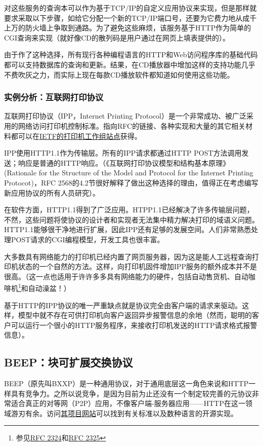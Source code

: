 \documentclass[12pt,oneside]{book}
\begin{document}
对这些服务的查询本可以作为基于TCP/IP的自定义应用协议来实现，但是那样就要求采取以下步骤，如给它分配一个新的TCP/IP端口号，还要为它费力地从成千上万的防火墙上争取到通路。为了避免这些麻烦，该服务基于HTTP作为简单的CGI查询来实现（就好像CD的散列码是用户通过在网页上填表提供的）。

由于作了这种选择，所有现行各种编程语言的HTTP和Web访问程序库的基础代码都可以支持数据库的查询和更新。结果，在CD播放器中增加这样的支持功能几乎不费吹灰之力，而实际上现在每款CD播放软件都知道如何使用这些功能。

\subsubsection{实例分析：互联网打印协议}
互联网打印协议（IPP，Internet Printing Protocol）是一个非常成功、被广泛采用的网络访问打印机控制标准。指向RFC的链接、各种实现和大量的其它相关材料都可以在\href{http://www.pwg.org/ipp/}{IETF的打印机工作组站点}获得。

IPP使用HTTP1.1作为传输层。所有的IPP请求都通过HTTP POST方法调用发送；响应是普通的HTTP响应。（《互联网打印协议模型和结构基本原理》(Rationale for the Structure of the Model and Protocol for the Internet Printing Protocot)，RFC 2568的4.2节很好解释了做出这种选择的理由，值得正在考虑编写新应用协议的所有人员研究）。

在软件方面，HTTP1.1得到了广泛应用。HTPP1.1已经解决了许多传输层问题，不然，这些问题将使协议的设计者和实现者无法集中精力解决打印的域语义问题。HTTP1.1能够很干净地进行扩展，因此IPP还有足够的发展空间。人们非常熟悉处理POST请求的CGI编程模型，开发工具也很丰富。

大多数具有网络能力的打印机已经内置了网页服务器，因为这是能人工远程查询打印机状态的一个自然的方法。这样，向打印机固件增加IPP服务的额外成本并不是很高。（这一点也适用于许许多多具有网络能力的硬件，包括自动售货机、自动咖啡机\footnote{参见\href{http://www.ietf.org/rfc/rfc2324.txt}{RFC 2324}和\href{http://www.ietf.org/rfc/rfc2325.txt}{RFC 2325}}和自动澡盆！）

基于HTTP的IPP协议的唯一严重缺点就是协议完全由客户端的请求来驱动。这样，模型中就不存在可供打印机向客户返回异步报警信息的余地（然而，聪明的客户可以运行一个很小的HTTP服务程序，来接收打印机发送的HTTP请求格式报警信息）。

\subsection{BEEP：块可扩展交换协议}
BEEP（原先叫BXXP）是一种通用协议，对于通用底层这一角色来说和HTTP一样具有竞争力。之所以说竞争，是因为目前为止还没有一个制定较完善的元协议非常适合真正的对等网（P2P）应用，不像客户端-服务器应用——HTTP在这一领域游刃有余。访问\href{http://www.beepcore.org/beepcore/docs/sl-beep.jsp}{其项目网站}可以找到有关标准以及数种语言的开源实现。
 
\end{document}
